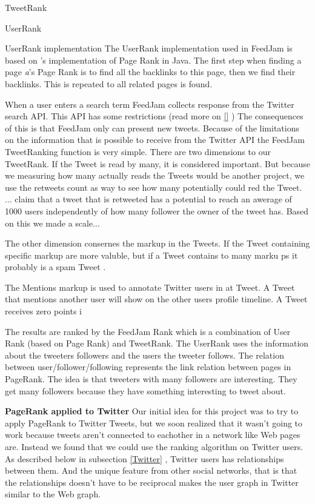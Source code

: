 TweetRank

UserRank


UserRank implementation
The UserRank implementation used in FeedJam is based on \citet{Goodrarzi2009}'s implementation of Page Rank in Java. The first step when finding a page \emph{a}'s Page Rank is to find all the backlinks to this page, then we find their backlinks. This is repeated to all related pages is found. 


When a user enters a search term FeedJam collects response from the Twitter search API. This API has some restrictions (read more on \ref{} \nameref{} )%
The consequences of this is that FeedJam only can present new tweets. Because of the limitations on the information that is possible to receive from the Twitter API the FeedJam TweetRanking function is very simple. There are two dimensions to our TweetRank. If the Tweet is read by many, it is considered important. But because we measuring how many actually reads the Tweets would be another project, we use the retweets count as way to see how many potentially could red the Tweet. ... claim that a tweet that is retweeted has a potential to reach an awerage of 1000 users independently of how many follower the owner of the tweet has. Based on this we made a scale... %

The other dimension consernes the markup in the Tweets. If the Tweet containing specific markup are more valuble, but if a Tweet contains to many marku ps it probably is a spam Tweet \citep{}.%

The Mentions markup is used to annotate Twitter users in at Tweet. A Tweet that mentions another user will show on the other users profile timeline.
A Tweet receives zero points i

The results are ranked by the FeedJam Rank which is a combination of User Rank (based on Page Rank) and TweetRank. The UserRank uses the information about the tweeters followers and the users the tweeter follows. The relation between user/follower/following represents the link relation between pages in PageRank. The idea is that tweeters with many followers are interesting. They get many followers because they have something interesting to tweet about. 

{\bf PageRank applied to Twitter}\newline %
Our initial idea for this project was to try to apply PageRank to Twitter Tweets, but we soon realized that it wasn't going to work because tweets aren't connected to eachother in a network like Web pages are. Instead we found that we could use the ranking algorithm on Twitter users. As described below in subsection \ref{Twitter} , Twitter users has relationships between them. And the unique feature from other social networks, that is that the relationships doesn't have to be reciprocal makes the user graph in Twitter similar to the Web graph. 

